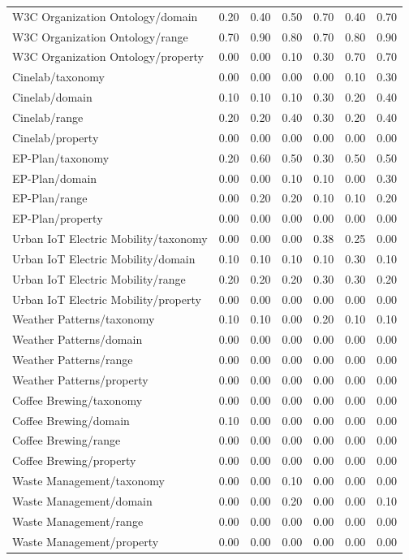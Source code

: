 \begin{tabular}{lcccccc}
W3C Organization Ontology/domain & 0.20 & 0.40 & 0.50 & 0.70 & 0.40 & 0.70 \\
W3C Organization Ontology/range & 0.70 & 0.90 & 0.80 & 0.70 & 0.80 & 0.90 \\
W3C Organization Ontology/property & 0.00 & 0.00 & 0.10 & 0.30 & 0.70 & 0.70 \\
Cinelab/taxonomy & 0.00 & 0.00 & 0.00 & 0.00 & 0.10 & 0.30 \\
Cinelab/domain & 0.10 & 0.10 & 0.10 & 0.30 & 0.20 & 0.40 \\
Cinelab/range & 0.20 & 0.20 & 0.40 & 0.30 & 0.20 & 0.40 \\
Cinelab/property & 0.00 & 0.00 & 0.00 & 0.00 & 0.00 & 0.00 \\
EP-Plan/taxonomy & 0.20 & 0.60 & 0.50 & 0.30 & 0.50 & 0.50 \\
EP-Plan/domain & 0.00 & 0.00 & 0.10 & 0.10 & 0.00 & 0.30 \\
EP-Plan/range & 0.00 & 0.20 & 0.20 & 0.10 & 0.10 & 0.20 \\
EP-Plan/property & 0.00 & 0.00 & 0.00 & 0.00 & 0.00 & 0.00 \\
Urban IoT Electric Mobility/taxonomy & 0.00 & 0.00 & 0.00 & 0.38 & 0.25 & 0.00 \\
Urban IoT Electric Mobility/domain & 0.10 & 0.10 & 0.10 & 0.10 & 0.30 & 0.10 \\
Urban IoT Electric Mobility/range & 0.20 & 0.20 & 0.20 & 0.30 & 0.30 & 0.20 \\
Urban IoT Electric Mobility/property & 0.00 & 0.00 & 0.00 & 0.00 & 0.00 & 0.00 \\
Weather Patterns/taxonomy & 0.10 & 0.10 & 0.00 & 0.20 & 0.10 & 0.10 \\
Weather Patterns/domain & 0.00 & 0.00 & 0.00 & 0.00 & 0.00 & 0.00 \\
Weather Patterns/range & 0.00 & 0.00 & 0.00 & 0.00 & 0.00 & 0.00 \\
Weather Patterns/property & 0.00 & 0.00 & 0.00 & 0.00 & 0.00 & 0.00 \\
Coffee Brewing/taxonomy & 0.00 & 0.00 & 0.00 & 0.00 & 0.00 & 0.00 \\
Coffee Brewing/domain & 0.10 & 0.00 & 0.00 & 0.00 & 0.00 & 0.00 \\
Coffee Brewing/range & 0.00 & 0.00 & 0.00 & 0.00 & 0.00 & 0.00 \\
Coffee Brewing/property & 0.00 & 0.00 & 0.00 & 0.00 & 0.00 & 0.00 \\
Waste Management/taxonomy & 0.00 & 0.00 & 0.10 & 0.00 & 0.00 & 0.00 \\
Waste Management/domain & 0.00 & 0.00 & 0.20 & 0.00 & 0.00 & 0.10 \\
Waste Management/range & 0.00 & 0.00 & 0.00 & 0.00 & 0.00 & 0.00 \\
Waste Management/property & 0.00 & 0.00 & 0.00 & 0.00 & 0.00 & 0.00 \\
\bottomrule
\end{tabular}
